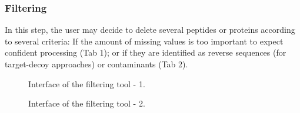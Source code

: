 \documentclass[12pt]{article}
\begin{document}
{%
\subsubsection{Filtering}\label{sec:filtering}
{In this step, the user may decide to delete several peptides or proteins 
according to several criteria:
If the amount of missing values is too important to expect confident 
processing (Tab 1); or if they are identified as reverse sequences (for 
target-decoy approaches) or contaminants (Tab 2).}

\begin {figure}
\centering
{}
\caption{Interface of the filtering tool - 1.}\label{fig:filter1}
\end {figure}

\begin {figure}
\centering
{}
\caption{Interface of the filtering tool - 2.}\label{fig:filter2}
\end {figure}

}
\end{document}
